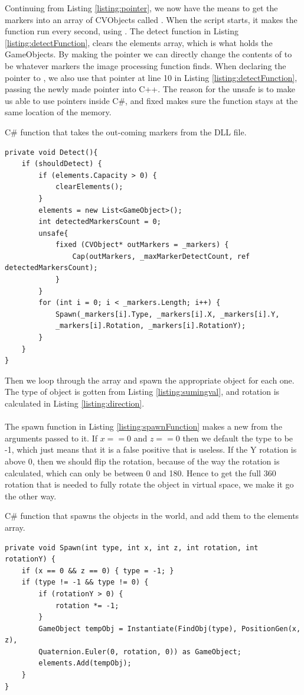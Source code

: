 	Continuing from Listing \ref{listing:pointer}, we now have the means to get the markers into an array of CVObjects called . When the script starts, it makes the  function run every second, using . The detect function in Listing \ref{listing:detectFunction}, clears the elements array, which is what holds the GameObjects. By making the pointer  we can directly change the contents of  to be whatever markers the image processing function finds. When declaring the pointer to , we also use that pointer at line 10 in Listing \ref{listing:detectFunction}, passing the newly made pointer into C++. The reason for the unsafe is to make us able to use pointers inside C\#, and fixed makes sure the function stays at the same location of the memory.
	\begin{listing}[H]
		\caption{C\# function that takes the out-coming markers from the DLL file.}
		\begin{verbatim}
private void Detect(){
	if (shouldDetect) {
		if (elements.Capacity > 0) {
			clearElements();
		}
		elements = new List<GameObject>();
		int detectedMarkersCount = 0;
		unsafe{
			fixed (CVObject* outMarkers = _markers) {
				Cap(outMarkers, _maxMarkerDetectCount, ref detectedMarkersCount);
			}
		}
		for (int i = 0; i < _markers.Length; i++) {
			Spawn(_markers[i].Type, _markers[i].X, _markers[i].Y,
			_markers[i].Rotation, _markers[i].RotationY);
		}
	}
}
	\end{verbatim}
\label{listing:detectFunction}
\end{listing}
Then we loop through the  array and spawn the appropriate object for each one. The type of object is gotten from Listing \ref{listing:sumingval}, and rotation is calculated in Listing \ref{listing:direction}.\\\\
The spawn function in Listing \ref{listing:spawnFunction} makes a new  from the arguments passed to it. If $x == 0$ and $z == 0$ then we default the type to be -1, which just means that it is a false positive that is useless. If the Y rotation is above 0, then we should flip the rotation, because of the way the rotation is calculated, which can only be between 0 and 180. Hence to get the full 360 rotation that is needed to fully rotate the object in virtual space, we make it go the other way.
\begin{listing}[H]
	\caption{C\# function that spawns the objects in the world, and add them to the elements array.}
	\begin{verbatim}
private void Spawn(int type, int x, int z, int rotation, int rotationY) {
	if (x == 0 && z == 0) { type = -1; }
	if (type != -1 && type != 0) {
		if (rotationY > 0) {
			rotation *= -1;
		}
		GameObject tempObj = Instantiate(FindObj(type), PositionGen(x, z),
		Quaternion.Euler(0, rotation, 0)) as GameObject;
		elements.Add(tempObj);
	}
}
	\end{verbatim}
\label{listing:spawnFunction}
\end{listing}
